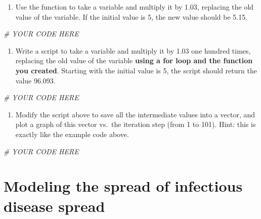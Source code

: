 \documentclass[
]{book}
\newenvironment{Shaded}{\begin{snugshade}}{\end{snugshade}}
\newcommand{\CommentTok}[1]{\textcolor[rgb]{0.56,0.35,0.01}{\textit{#1}}}
\providecommand{\tightlist}{%
  \setlength{\itemsep}{0pt}\setlength{\parskip}{0pt}}
\theoremstyle{definition}
\theoremstyle{definition}
\theoremstyle{definition}
\theoremstyle{remark}
\begin{document}
\begin{enumerate}
\def\labelenumi{\arabic{enumi}.}
\setcounter{enumi}{1}
\tightlist
\item
  Use the function to take a variable and multiply it by 1.03, replacing the old value of the variable. If the initial value is 5, the new value should be 5.15.
\end{enumerate}

\begin{Shaded}
\begin{Highlighting}[]
\CommentTok{\# YOUR CODE HERE}
\end{Highlighting}
\end{Shaded}

\begin{enumerate}
\def\labelenumi{\arabic{enumi}.}
\setcounter{enumi}{2}
\tightlist
\item
  Write a script to take a variable and multiply it by 1.03 one hundred times, replacing the old value of the variable \textbf{using a for loop and the function you created}. Starting with the initial value is 5, the script should return the value 96.093.
\end{enumerate}

\begin{Shaded}
\begin{Highlighting}[]
\CommentTok{\# YOUR CODE HERE}
\end{Highlighting}
\end{Shaded}

\begin{enumerate}
\def\labelenumi{\arabic{enumi}.}
\setcounter{enumi}{3}
\tightlist
\item
  Modify the script above to save all the intermediate values into a vector, and plot a graph of this vector vs.~the iteration step (from 1 to 101). Hint: this is exactly like the example code above.
\end{enumerate}

\begin{Shaded}
\begin{Highlighting}[]
\CommentTok{\# YOUR CODE HERE}
\end{Highlighting}
\end{Shaded}

\hypertarget{modeling-the-spread-of-infectious-disease-spread}{%
\section{Modeling the spread of infectious disease spread}\label{modeling-the-spread-of-infectious-disease-spread}}
\end{document}
